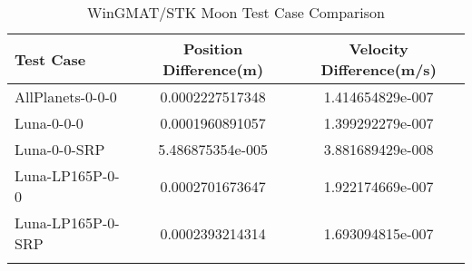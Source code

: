 \begin{table}[htbp!]
\centering
\caption{ WinGMAT/STK Moon Test Case Comparison}
      \begin{tabular}{lcc}
      \hline\hline
          Test Case & Position Difference(m) & Velocity Difference(m/s) \\
         \hline
         AllPlanets-0-0-0 & 0.0002227517348 & 1.414654829e-007 \\
         Luna-0-0-0 & 0.0001960891057 & 1.399292279e-007 \\
         Luna-0-0-SRP & 5.486875354e-005 & 3.881689429e-008 \\
         Luna-LP165P-0-0 & 0.0002701673647 & 1.922174669e-007 \\
         Luna-LP165P-0-SRP & 0.0002393214314 & 1.693094815e-007 \\
      \hline\hline
      \label{Table: Moon WinGMAT-STK Table} 
\end{tabular}
\end{table}
